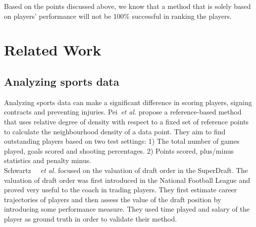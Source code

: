 Based on the points discussed above, we know that a method that is solely based on players' performance will not be 100\% successful in ranking the players. 


\section{Related Work }
\subsection{Analyzing sports data}
 Analyzing sports data can make a significant difference in scoring players, signing contracts and preventing injuries. Pei{~\em et al.}\cite{Pei2006} propose a reference-based method that uses relative degree of density with respect to a fixed set of reference points to calculate the neighbourhood density of a data point. They aim to find outstanding players based on two test settings: 1) The total number of games played, goals scored and shooting percentages. 2) Points scored, plus/minus statistics and penalty minus. \\
Schwartz~\cite{schwartz} {~\em et al.} focused on the valuation of draft order in the SuperDraft. The valuation of draft order was first introduced in the National Football League and proved very useful to the coach in trading players. They first estimate career trajectories of players and then assess the value of the draft position by introducing some performance measure. They used time played and salary of the player as ground truth in order to validate their method.

